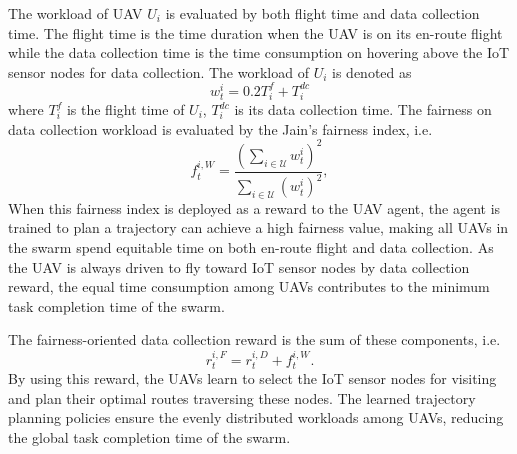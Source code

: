 \documentclass[journal]{IEEEtran}
\begin{document}
The workload of UAV $U_i$ is evaluated by both flight time and data collection time. The flight time is the time duration when the UAV is on its en-route flight while the data collection time is the time consumption on hovering above the IoT sensor nodes for data collection. The workload of $U_i$ is denoted as 
\begin{equation}\label{workload}
w^i_t = 0.2T_i^f + T_i^{dc}
\end{equation}
where $T_i^f$ is the flight time of $U_i$, $T_i^{dc}$ is its data collection time. 
The fairness on data collection workload is evaluated by the Jain's fairness index, i.e. 
\begin{equation}\label{fairness_uav}
f^{i,W}_t=\frac{\left({{\sum_{i\in \mathcal{U}}}{w^i_t}}\right)^{2}}{\sum_{i\in \mathcal{U}}\left({w^i_t}\right)^2}, 
\end{equation}
When this fairness index is deployed as a reward to the UAV agent, the agent is trained to plan a trajectory can achieve a high fairness value, making all UAVs in the swarm spend equitable time on both en-route flight and data collection. As the UAV is always driven to fly toward IoT sensor nodes by data collection reward, the equal time consumption among UAVs contributes to the minimum task completion time of the swarm. 

The fairness-oriented data collection reward is the sum of these components, i.e.
\begin{equation}\label{reward_fair}
r^{i,F}_{t}=r^{i,D}_{t}+f^{i,W}_t. 
\end{equation} 
By using this reward, the UAVs learn to select the IoT sensor nodes for visiting and plan their optimal routes traversing these nodes. The learned trajectory planning policies ensure the evenly distributed workloads among UAVs, reducing the global task completion time of the swarm. 
\end{document}
